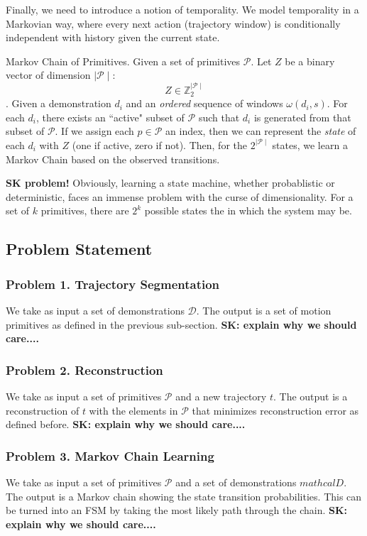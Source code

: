 Finally, we need to introduce a notion of temporality.
We model temporality in a Markovian way, where every 
next action (trajectory window) is conditionally independent 
with history given the current state.

\begin{definition} Markov Chain of Primitives.
Given a set of primitives $\mathcal{P}$.
Let $Z$ be a binary vector of dimension $\mid\mathcal{P}\mid$:
\[Z\in \mathbb{Z}_2^{\mid\mathcal{P}\mid}\].
Given a demonstration $d_i$ and an \emph{ordered} sequence of windows
$\omega(d_i,s)$.
For each $d_i$, there exists an ``active" subset of $\mathcal{P}$ such 
that $d_i$ is generated from that subset of $\mathcal{P}$.
If we assign each $p\in \mathcal{P}$ an index, then we can represent
the \emph{state} of each $d_i$ with $Z$ (one if active, zero if not).
Then, for the $2^{\mid\mathcal{P}\mid}$ states, we learn a Markov
Chain based on the observed transitions.
\end{definition}

\textbf{SK problem!}
Obviously, learning a state machine, whether probablistic or deterministic, faces an immense problem with the curse of
dimensionality. For a set of $k$ primitives, there are $2^k$ possible states the in which the system may be.


\subsection{Problem Statement}

\subsubsection{Problem 1. Trajectory Segmentation}
We take as input a set of demonstrations $\mathcal{D}$. 
The output is a set of motion primitives as defined in the previous sub-section.
\textbf{SK: explain why we should care....}

\subsubsection{Problem 2. Reconstruction}
We take as input a set of primitives $\mathcal{P}$ and a new trajectory $t$. 
The output is a reconstruction of $t$ with the elements in $\mathcal{P}$ that minimizes reconstruction error as defined before.
\textbf{SK: explain why we should care....}

\subsubsection{Problem 3. Markov Chain Learning}
We take as input a set of primitives $\mathcal{P}$ and a set of demonstrations $mathcal{D}$. 
The output is a Markov chain showing the state transition probabilities.
This can be turned into an FSM by taking the most likely path through the chain.
\textbf{SK: explain why we should care....}
